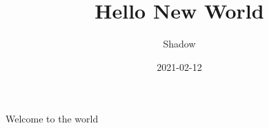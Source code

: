\documentclass{article}
\title{Hello New World}
\date{2021-02-12}
\author{Shadow}
\begin{document}
	\maketitle
	\newpage
	Welcome to the world
\end{document}
